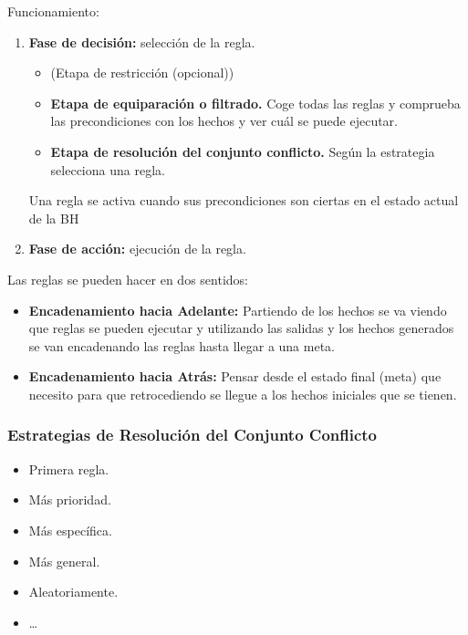 \documentclass[12pt, twoside, openright]{report} %
\begin{document}
Funcionamiento:
\begin{enumerate}
	\item \textbf{Fase de decisión:} selección de la regla.
	\begin{itemize}
		\item (Etapa de restricción (opcional))
		\item \textbf{Etapa de equiparación o filtrado.} Coge todas las reglas y comprueba las precondiciones con los hechos y ver cuál se puede ejecutar.
		\item \textbf{Etapa de resolución del conjunto conflicto.} Según la estrategia selecciona una regla.
	\end{itemize}
	
	Una regla se activa cuando sus precondiciones son ciertas en el estado
	actual de la BH
	\item \textbf{Fase de acción:} ejecución de la regla.
\end{enumerate}

Las reglas se pueden hacer en dos sentidos:
\begin{itemize}
	\item \textbf{Encadenamiento hacia Adelante:} Partiendo de los hechos se va viendo que reglas se pueden ejecutar y utilizando las salidas y los hechos generados se van encadenando las reglas hasta llegar a una meta.
	\item \textbf{Encadenamiento hacia Atrás:} Pensar desde el estado final (meta) que necesito para que retrocediendo se llegue a los hechos iniciales que se tienen.
\end{itemize}
\subsubsection{Estrategias de Resolución del Conjunto Conflicto}
\begin{itemize}
	\item Primera regla.
	\item Más prioridad.
	\item Más específica.
	\item Más general.
	\item Aleatoriamente.
	\item …
\end{itemize}
\end{document}
